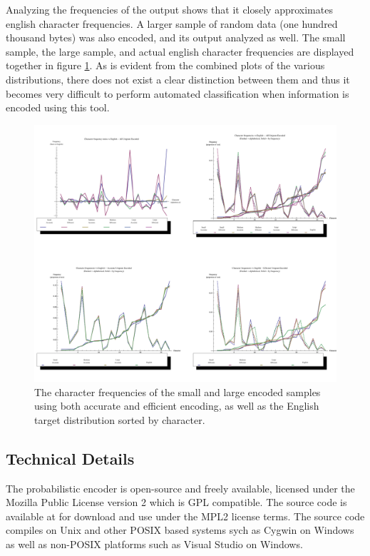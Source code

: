 \documentclass[12pt]{report}
\theoremstyle{remark}
\theoremstyle{definition}
\theoremstyle{definition}
\theoremstyle{definition}
\begin{document}
\begin{appendices}
Analyzing the frequencies of the output shows that it closely approximates
english character frequencies. A larger sample of random data (one hundred
thousand bytes) was also encoded, and its output analyzed as well. The small
sample, the large sample, and actual english character frequencies are displayed
together in figure \ref{FIGURE_frequencies-bytop}. As is evident from the combined plots of the
various distributions, there does not exist a clear distinction between them and
thus it becomes very difficult to perform automated classification when
information is encoded using this tool.

\begin{landscape}
\begin{figure}
\centering
\includegraphics[width=1.15\textwidth]{../figures/plots_unigram.pdf}
\caption[Plot of Character Frequencies]{The character frequencies of the small and large encoded samples using both accurate and efficient encoding, as well as the English target distribution sorted by character.}
\label{FIGURE_frequencies-bytop}
\end{figure}
\end{landscape}

\subsection{Technical Details} The probabilistic encoder is open-source and
freely available, licensed under the Mozilla Public License version 2 which is
GPL compatible. The source code is available at \cite{probcodesrc} for download
and use under the MPL2 license terms. The source code compiles on Unix and other
POSIX based systems sych as Cygwin on Windows as well as non-POSIX platforms such as Visual Studio on Windows.


\end{appendices}
\end{document}
